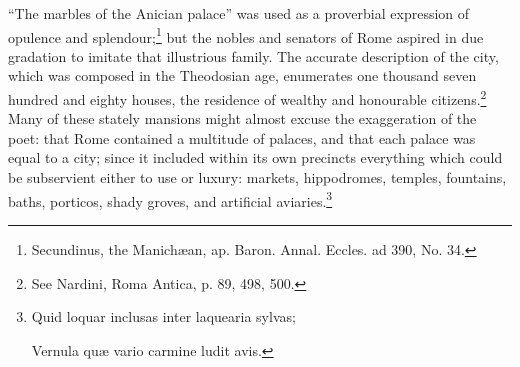 \texthebrew{“}The marbles of the Anician palace\texthebrew{}” was used as a proverbial expression of opulence and splendour;\footnote{Secundinus, the Manichæan, ap. Baron. Annal. Eccles. ad 390, No. 34.} but the nobles and senators of Rome aspired in due gradation to imitate that illustrious family. The accurate description of the city, which was composed in the Theodosian age, enumerates one thousand seven hundred and eighty houses, the residence of wealthy and honourable citizens.\footnote{See Nardini, Roma Antica, p. 89, 498, 500.} Many of these stately mansions might almost excuse the exaggeration of the poet: that Rome contained a multitude of palaces, and that each palace was equal to a city; since it included within its own precincts everything which could be subservient either to use or luxury: markets, hippodromes, temples, fountains, baths, porticos, shady groves, and artificial aviaries.\footnote{Quid loquar inclusas inter laquearia sylvas;

Vernula quæ vario carmine ludit avis.

}
